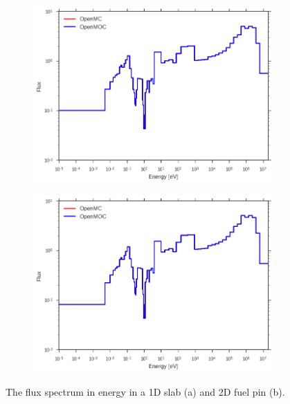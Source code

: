 \begin{figure}[H]
\begin{subfigure}{0.9\textwidth}
  \centering
  \includegraphics[width=\linewidth]{figures/biases/slab/vol-avg-flux}
  \caption{}
\end{subfigure}
\begin{subfigure}{0.9\textwidth}
  \centering
  \includegraphics[width=\linewidth]{figures/biases/pin-cell/vol-avg-flux}
  \caption{}
\end{subfigure}
\caption[Flux spectrum in a slab and pin cell]{The flux spectrum in energy in a 1D slab (a) and 2D fuel pin (b).}
\label{fig:chap4-flux}
\end{figure}

